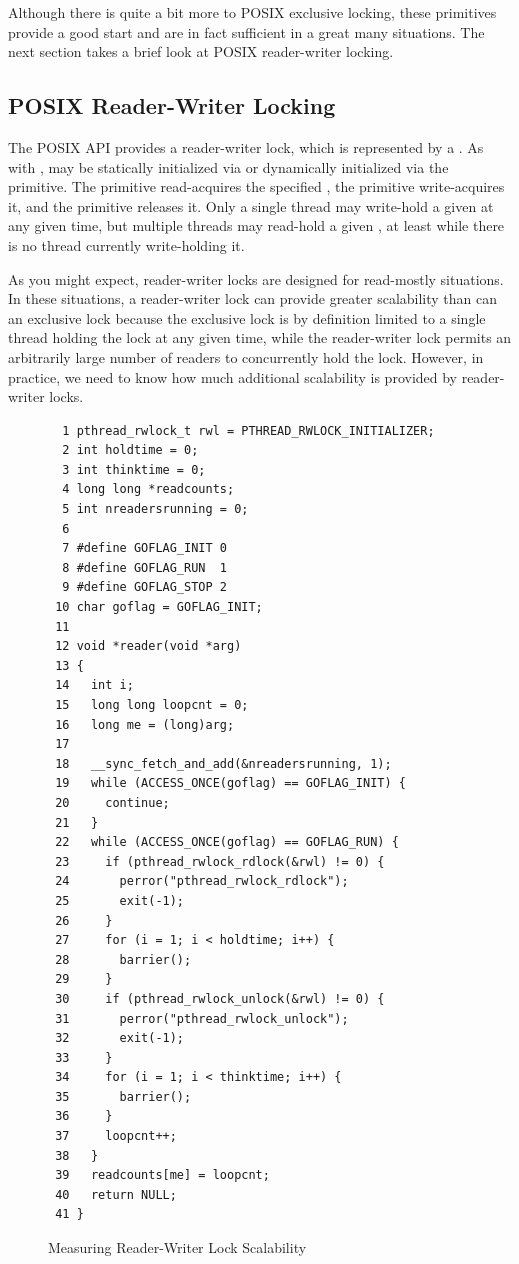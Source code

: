 Although there is quite a bit more to POSIX exclusive locking, these
primitives provide a good start and are in fact sufficient in a great
many situations.
The next section takes a brief look at POSIX reader-writer locking.

\subsection{POSIX Reader-Writer Locking}
\label{sec:toolsoftrade:POSIX Reader-Writer Locking}

The POSIX API provides a reader-writer lock, which is represented by
a .
As with ,  may be statically
initialized via  or dynamically
initialized via the  primitive.
The  primitive read-acquires the
specified , the 
primitive write-acquires it, and the 
primitive releases it.
Only a single thread may write-hold a given 
at any given time, but multiple threads may read-hold a given
, at least while there is no thread
currently write-holding it.

As you might expect, reader-writer locks are designed for read-mostly
situations.
In these situations, a reader-writer lock can provide greater scalability
than can an exclusive lock because the exclusive lock is by definition
limited to a single thread holding the lock at any given time, while
the reader-writer lock permits
an arbitrarily large number of readers to concurrently hold the lock.
However, in practice, we need to know how much additional scalability is
provided by reader-writer locks.

\begin{figure}[tbp]
{ \scriptsize
\begin{verbatim}
  1 pthread_rwlock_t rwl = PTHREAD_RWLOCK_INITIALIZER;
  2 int holdtime = 0;
  3 int thinktime = 0;
  4 long long *readcounts;
  5 int nreadersrunning = 0;
  6 
  7 #define GOFLAG_INIT 0
  8 #define GOFLAG_RUN  1
  9 #define GOFLAG_STOP 2
 10 char goflag = GOFLAG_INIT;
 11 
 12 void *reader(void *arg)
 13 {
 14   int i;
 15   long long loopcnt = 0;
 16   long me = (long)arg;
 17 
 18   __sync_fetch_and_add(&nreadersrunning, 1);
 19   while (ACCESS_ONCE(goflag) == GOFLAG_INIT) {
 20     continue;
 21   }
 22   while (ACCESS_ONCE(goflag) == GOFLAG_RUN) {
 23     if (pthread_rwlock_rdlock(&rwl) != 0) {
 24       perror("pthread_rwlock_rdlock");
 25       exit(-1);
 26     }
 27     for (i = 1; i < holdtime; i++) {
 28       barrier();
 29     }
 30     if (pthread_rwlock_unlock(&rwl) != 0) {
 31       perror("pthread_rwlock_unlock");
 32       exit(-1);
 33     }
 34     for (i = 1; i < thinktime; i++) {
 35       barrier();
 36     }
 37     loopcnt++;
 38   }
 39   readcounts[me] = loopcnt;
 40   return NULL;
 41 }
\end{verbatim}
}
\caption{Measuring Reader-Writer Lock Scalability}
\label{fig:toolsoftrade:Measuring Reader-Writer Lock Scalability}
\end{figure}

